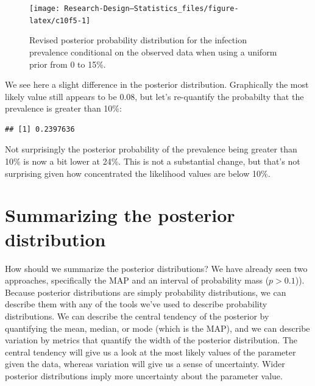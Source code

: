 \documentclass[
]{book}
\newenvironment{Shaded}{\begin{snugshade}}{\end{snugshade}}
\newcommand{\FloatTok}[1]{\textcolor[rgb]{0.00,0.00,0.81}{#1}}
\newcommand{\FunctionTok}[1]{\textcolor[rgb]{0.13,0.29,0.53}{\textbf{#1}}}
\newcommand{\NormalTok}[1]{#1}
\newcommand{\SpecialCharTok}[1]{\textcolor[rgb]{0.81,0.36,0.00}{\textbf{#1}}}
\begin{document}
\begin{figure}

{\centering \texttt{[image: Research-Design---Statistics\_files/figure-latex/c10f5-1]} 

}

\caption{Revised posterior probability distribution for the infection prevalence conditional on the observed data when using a uniform prior from 0 to 15\%.}\label{fig:c10f5}
\end{figure}

We see here a slight difference in the posterior distribution. Graphically the most likely value still appears to be 0.08, but let's re-quantify the probabilty that the prevalence is greater than 10\%:

\begin{Shaded}
\end{Shaded}

\begin{verbatim}
## [1] 0.2397636
\end{verbatim}

Not surprisingly the posterior probability of the prevalence being greater than 10\% is now a bit lower at 24\%. This is not a substantial change, but that's not surprising given how concentrated the likelihood values are below 10\%.

\section{Summarizing the posterior distribution}\label{summarizing-the-posterior-distribution}

How should we summarize the posterior distributions? We have already seen two approaches, specifically the MAP and an interval of probability mass (\(p>0.1\))). Because posterior distributions are simply probability distributions, we can describe them with any of the tools we've used to describe probability distributions. We can describe the central tendency of the posterior by quantifying the mean, median, or mode (which is the MAP), and we can describe variation by metrics that quantify the width of the posterior distribution. The central tendency will give us a look at the most likely values of the parameter given the data, whereas variation will give us a sense of uncertainty. Wider posterior distributions imply more uncertainty about the parameter value.
\end{document}
